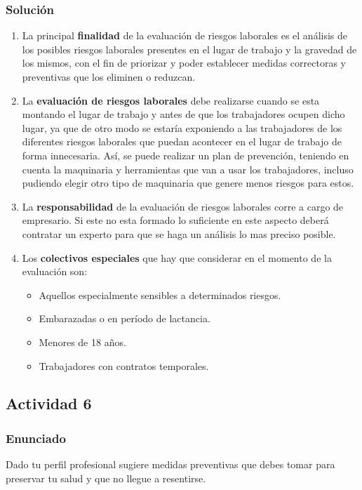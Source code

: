 \subsubsection{Solución}

\begin{enumerate}[label=\alph*)]
    \item La principal \textbf{finalidad} de la evaluación de riesgos laborales es el análisis de los posibles riesgos laborales presentes en el lugar de trabajo y la gravedad de los mismos, con el fin de priorizar y poder establecer medidas correctoras y preventivas que los eliminen o reduzcan.
    \item La \textbf{evaluación de riesgos laborales} debe realizarse cuando se esta montando el lugar de trabajo y antes de que los trabajadores ocupen dicho lugar, ya que de otro modo se estaría exponiendo a las trabajadores de los diferentes riesgos laborales que puedan acontecer en el lugar de trabajo de forma innecesaria. Así, se puede realizar un plan de prevención, teniendo en cuenta la maquinaria y herramientas que van a usar los trabajadores, incluso pudiendo elegir otro tipo de maquinaria que genere menos riesgos para estos.
    \item La \textbf{responsabilidad} de la evaluación de riesgos laborales corre a cargo de empresario. Si este no esta formado lo suficiente en este aspecto deberá contratar un experto para que se haga un análisis lo mas preciso posible.
    \item Los \textbf{colectivos especiales} que hay que considerar en el momento de la evaluación son:
    \begin{itemize}
        \item Aquellos especialmente sensibles a determinados riesgos.
        \item Embarazadas o en período de lactancia.
        \item Menores de 18 años.
        \item Trabajadores con contratos temporales.
    \end{itemize}
\end{enumerate}

\subsection{Actividad 6}

\subsubsection{Enunciado}
Dado tu perfil profesional sugiere medidas preventivas que debes tomar para preservar tu salud y que no llegue a resentirse.

